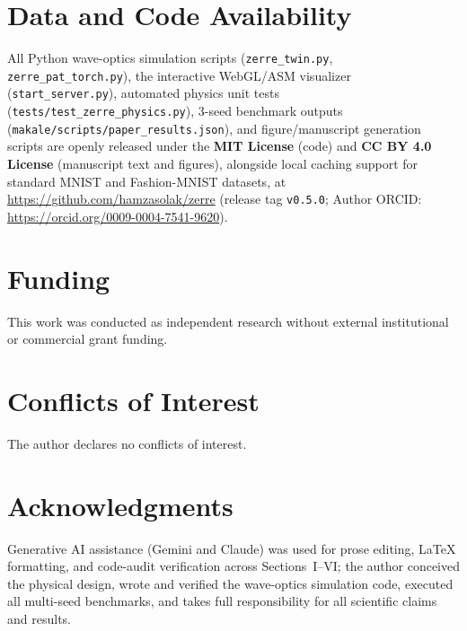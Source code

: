 \documentclass[journal]{IEEEtran}
\begin{document}
\section*{Data and Code Availability}
All Python wave-optics simulation scripts (\texttt{zerre\_twin.py}, \texttt{zerre\_pat\_torch.py}), the interactive WebGL/ASM visualizer (\texttt{start\_server.py}), automated physics unit tests (\texttt{tests/test\_zerre\_physics.py}), 3-seed benchmark outputs (\texttt{makale/scripts/paper\_results.json}), and figure/manuscript generation scripts are openly released under the \textbf{MIT License} (code) and \textbf{CC BY 4.0 License} (manuscript text and figures), alongside local caching support for standard MNIST and Fashion-MNIST datasets, at \url{https://github.com/hamzasolak/zerre} (release tag \texttt{v0.5.0}; Author ORCID: \url{https://orcid.org/0009-0004-7541-9620}).

\section*{Funding}
This work was conducted as independent research without external institutional or commercial grant funding.

\section*{Conflicts of Interest}
The author declares no conflicts of interest.

\section*{Acknowledgments}
Generative AI assistance (Gemini and Claude) was used for prose editing, LaTeX formatting, and code-audit verification across Sections~I--VI; the author conceived the physical design, wrote and verified the wave-optics simulation code, executed all multi-seed benchmarks, and takes full responsibility for all scientific claims and results.

\balance


\end{document}
